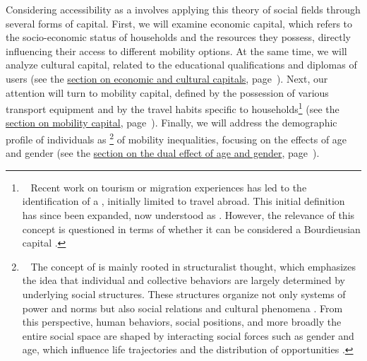 \begin{refsegment}
Considering accessibility as a  involves applying this theory of social fields through several forms of capital. First, we will examine economic capital, which refers to the socio-economic status of households and the resources they possess, directly influencing their access to different mobility options. At the same time, we will analyze cultural capital, related to the educational qualifications and diplomas of users (see the \hyperref[chap4:capital-economique-culturel]{section on economic and cultural capitals}, page~\pageref{chap4:capital-economique-culturel}). Next, our attention will turn to mobility capital, defined by the possession of various transport equipment and by the travel habits specific to households\footnote{~
    Recent work on tourism or migration experiences has led to the identification of a  \textcolor{blue}{\autocite[22]{murphy-lejeune_mobilite_2000}}, initially limited to travel abroad. This initial definition has since been expanded, now understood as  \textcolor{blue}{\autocite[116]{joxe_capital_2022}}. However, the relevance of this concept is questioned in terms of whether it can be considered a Bourdieusian capital \textcolor{blue}{\autocite{borja_mobilite_2012}}.
} (see the \hyperref[chap4:capital-mobilite]{section on mobility capital}, page~\pageref{chap4:capital-mobilite}). Finally, we will address the demographic profile of individuals as \footnote{~
    The concept of  is mainly rooted in structuralist thought, which emphasizes the idea that individual and collective behaviors are largely determined by underlying social structures. These structures organize not only systems of power and norms but also social relations and cultural phenomena \textcolor{blue}{\autocites{saussure_cours_1995}{levi-strauss_anthropologie_1958}}. From this perspective, human behaviors, social positions, and more broadly the entire social space are shaped by interacting social forces such as gender and age, which influence life trajectories and the distribution of opportunities \textcolor{blue}{\autocites{humphrey_gender_1992}{lynch_love_2007}}.
} of mobility inequalities, focusing on the effects of age and gender (see the \hyperref[chap4:demographie]{section on the dual effect of age and gender}, page~\pageref{chap4:demographie}).%


\end{refsegment}
